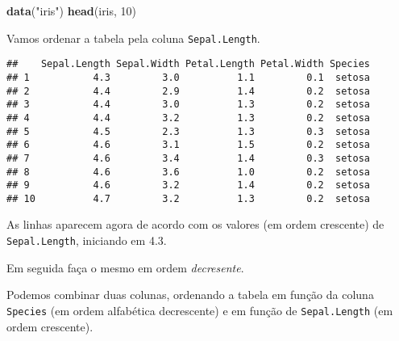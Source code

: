 \documentclass[
]{book}
\newenvironment{Shaded}{\begin{snugshade}}{\end{snugshade}}
\newcommand{\DecValTok}[1]{\textcolor[rgb]{0.00,0.00,0.81}{#1}}
\newcommand{\KeywordTok}[1]{\textcolor[rgb]{0.13,0.29,0.53}{\textbf{#1}}}
\newcommand{\NormalTok}[1]{#1}
\newcommand{\OperatorTok}[1]{\textcolor[rgb]{0.81,0.36,0.00}{\textbf{#1}}}
\newcommand{\StringTok}[1]{\textcolor[rgb]{0.31,0.60,0.02}{#1}}
\begin{document}
\begin{Shaded}
\begin{Highlighting}[]
\KeywordTok{data}\NormalTok{(}\StringTok{"iris"}\NormalTok{)}
\KeywordTok{head}\NormalTok{(iris, }\DecValTok{10}\NormalTok{)}
\end{Highlighting}
\end{Shaded}

Vamos ordenar a tabela pela coluna \texttt{Sepal.Length}.

\begin{Shaded}
\end{Shaded}

\begin{verbatim}
##    Sepal.Length Sepal.Width Petal.Length Petal.Width Species
## 1           4.3         3.0          1.1         0.1  setosa
## 2           4.4         2.9          1.4         0.2  setosa
## 3           4.4         3.0          1.3         0.2  setosa
## 4           4.4         3.2          1.3         0.2  setosa
## 5           4.5         2.3          1.3         0.3  setosa
## 6           4.6         3.1          1.5         0.2  setosa
## 7           4.6         3.4          1.4         0.3  setosa
## 8           4.6         3.6          1.0         0.2  setosa
## 9           4.6         3.2          1.4         0.2  setosa
## 10          4.7         3.2          1.3         0.2  setosa
\end{verbatim}

As linhas aparecem agora de acordo com os valores (em ordem crescente) de \texttt{Sepal.Length}, iniciando em 4.3.

Em seguida faça o mesmo em ordem \emph{decresente}.

\begin{Shaded}
\end{Shaded}

Podemos combinar duas colunas, ordenando a tabela em função da coluna \texttt{Species} (em ordem alfabética decrescente) e em função de \texttt{Sepal.Length} (em ordem crescente).
\end{document}
